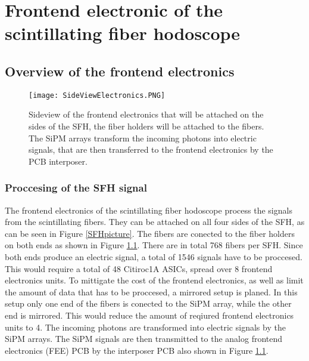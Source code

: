 \chapter{Frontend electronic of the scintillating fiber hodoscope}\label{cha:frontend}


\section{Overview of the frontend electronics}
\begin{figure}[h]
    \centering
    \texttt{[image: SideViewElectronics.PNG]}
    \caption{Sideview of the frontend electronics that will be attached on the sides of the SFH, the fiber holders will be attached to the fibers.
     The SiPM arrays transform the incoming photons into  electric signals, that are then transferred to the frontend electronics by the PCB interposer.\autocite{InternalcommunicationKarl}}
    \label{fig:SideviewModelElectronics}
    \end{figure}
\subsection{Proccesing of the SFH signal}
The frontend electronics of the scintillating fiber hodoscope process the signals from the scintillating fibers.
They can be attached on all four sides of the SFH, as can be seen in Figure \ref{SFHpicture}.
The fibers are conected to the fiber holders on both ends as shown in Figure \ref{fig:SideviewModelElectronics}. 
There are in total 768\autocite{Amber2022Status} fibers per SFH. Since both ends produce an electric signal,
 a total of 1546 signals have to be proccesed. This would require a total of 48 Citiroc1A ASICs, spread over 8 frontend electronics units. 
 To mittigate the cost of the frontend electronics, as well as limit the amount of data that has to be proccesed, a mirrored setup is planed.
 In this setup only one end of the fibers is conected to the SiPM array, while the other end is mirrored. This would reduce the amount of reqiured frontend electronics units to 4.\autocite{InternalcommunicationKarl}
 \newline
 The incoming photons are transformed into electric signals by the SiPM arrays.
 The SiPM signals are then transmitted to the analog frontend electronics (FEE) PCB by the interposer PCB also shown in Figure \ref{fig:SideviewModelElectronics}.\autocite{InternalcommunicationKarl}
